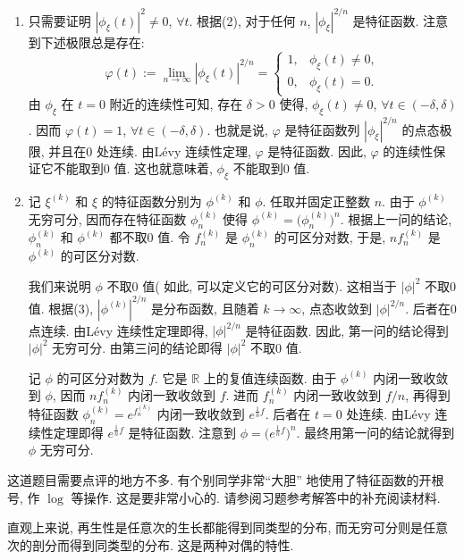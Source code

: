 \begin{enumerate}
\begin{proofc}
\begin{enumerate}[label=(\arabic*)]
\item 只需要证明 $|\phi_{\xi}(t)|^{2} \neq0$, $\forall t$. 根据(2), 对于任何 $n$, $|\phi_{\xi}|^{2 / n}$ 是特征函数. 注意到下述极限总是存在:
\[
\varphi(t):=\lim _{n \to \infty}\left|\phi_{\xi}(t)\right|^{2 / n}= \begin{cases}1, & \phi_{\xi}(t) \neq 0, \\ 0, & \phi_{\xi}(t)=0 .\end{cases}
\]
由 $\phi_{\xi}$ 在 $t=0$ 附近的连续性可知, 存在 $\delta>0$ 使得, $\phi_{\xi}(t) \neq0$, $\forall t \in(-\delta, \delta)$. 
因而 $\varphi(t)=1$, $\forall t \in(-\delta, \delta)$. 也就是说, $\varphi$ 是特征函数列 $|\phi_{\xi}|^{2 / n}$ 的点态极限, 并且在$0$ 处连续. 
由Lévy 连续性定理, $\varphi$ 是特征函数. 因此, $\varphi$ 的连续性保证它不能取到$0$ 值. 这也就意味着, $\phi_{\xi}$ 不能取到$0$ 值.

\item 记 $\xi^{(k)}$ 和 $\xi$ 的特征函数分别为 $\phi^{(k)}$ 和 $\phi$. 
任取并固定正整数 $n$. 由于 $\phi^{(k)}$ 无穷可分, 因而存在特征函数 $\phi_{n}^{(k)}$ 使得 $\phi^{(k)}=\big(\phi_{n}^{(k)}\big)^{n}$. 
根据上一问的结论, $\phi_{n}^{(k)}$ 和 $\phi^{(k)}$ 都不取$0$ 值. 
令 $f_{n}^{(k)}$ 是 $\phi_{n}^{(k)}$ 的可区分对数, 于是, $n f_{n}^{(k)}$ 是 $\phi^{(k)}$ 的可区分对数.

我们来说明 $\phi$ 不取$0$ 值( 如此, 可以定义它的可区分对数). 这相当于 $|\phi|^2$ 不取$0$ 值. 
根据(3), $|\phi^{(k)}|^{2 / n}$ 是分布函数, 且随着 $k \to \infty$, 点态收敛到 $|\phi|^{2 / n}$. 后者在$0$ 点连续. 
由Lévy 连续性定理即得, $|\phi|^{2/n}$ 是特征函数. 因此, 第一问的结论得到 $|\phi|^2$ 无穷可分. 由第三问的结论即得 $|\phi|^2$ 不取$0$ 值.

记 $\phi$ 的可区分对数为 $f$. 它是 $\mathbb{R}$ 上的复值连续函数. 
由于 $\phi^{(k)}$ 内闭一致收敛到 $\phi$, 因而 $n f_{n}^{(k)}$ 内闭一致收敛到 $f$. 
进而 $f_{n}^{(k)}$ 内闭一致收敛到 $f / n$, 再得到特征函数 $\phi_{n}^{(k)}=e^{f_{n}^{(k)}}$ 内闭一致收敛到 $e^{\frac{1}{n} f}$. 后者在 $t=0$ 处连续. 
由Lévy 连续性定理即得 $e^{\frac{1}{n} f}$ 是特征函数. 注意到 $\phi=\big(e^{\frac{1}{n} f}\big)^{n}$. 最终用第一问的结论就得到 $\phi$ 无穷可分.
\end{enumerate}

这道题目需要点评的地方不多. 有个别同学非常“大胆” 地使用了特征函数的开根号, 作 $\log$ 等操作. 这是要非常小心的. 请参阅习题参考解答中的补充阅读材料.

直观上来说, 再生性是任意次的生长都能得到同类型的分布, 而无穷可分则是任意次的剖分而得到同类型的分布. 这是两种对偶的特性.
\end{proofc}
\printfootnotes
\end{enumerate}


